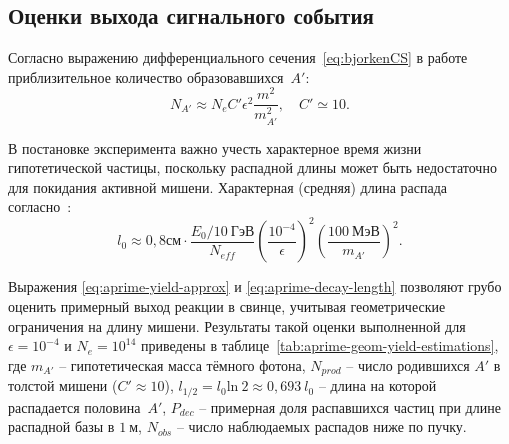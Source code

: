 \subsection{Оценки выхода сигнального события}

Согласно выражению дифференциального сечения~\eqref{eq:bjorkenCS}
в работе~\cite{bjorken} приблизительное количество
образовавшихся~$A'$:
\begin{equation}
    N_{A'} \approx N_e C' \epsilon^2 \frac{m^2}{m^2_{A'}}, \quad C' \simeq 10.
    \label{eq:aprime-yield-approx}
\end{equation}

В постановке эксперимента важно учесть характерное время
жизни гипотетической частицы, поскольку распадной длины может
быть недостаточно для покидания активной мишени. Характерная
(средняя) длина распада согласно~\cite{bjorken}:
\begin{equation}
    l_0 \approx 0{,}8 \text{см} \cdot \frac{E_0 / 10 ~\text{ГэВ}}{N_{eff}}
        \left( \frac{10^{-4}}{\epsilon} \right)^2 \left( \frac{100~\text{МэВ}}{m_{A'}} \right)^2.
    \label{eq:aprime-decay-length}
\end{equation}

Выражения \eqref{eq:aprime-yield-approx} и \eqref{eq:aprime-decay-length}
позволяют грубо оценить примерный выход реакции в свинце,
учитывая геометрические ограничения на длину мишени. Результаты
такой оценки выполненной для $\epsilon = 10^{-4}$ и $N_{e} = 10^{14}$ приведены в
таблице~\ref{tab:aprime-geom-yield-estimations}, где
$m_{A'}$ -- гипотетическая масса тёмного фотона,
$N_{prod}$ -- число родившихся $A'$ в толстой мишени ($C'\approx 10$),
$l_{1/2} = l_0 \text{ln}~2 \approx 0{,}693 ~ l_0$ -- длина
на которой распадается половина~$A'$,
$P_{dec}$ -- примерная доля распавшихся частиц при длине распадной базы
в $1~\mathrm{м}$,
$N_{obs}$ -- число наблюдаемых распадов ниже по пучку.

